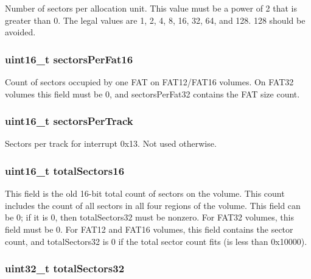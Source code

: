 Number of sectors per allocation unit. This value must be a power of 2 that is greater than 0. The legal values are 1, 2, 4, 8, 16, 32, 64, and 128. 128 should be avoided. \hypertarget{structfat__boot_abf85d1c57b01c8901a0cdcd0ac1babc2}{
\subsubsection[{sectors\-Per\-Fat16}]{\setlength{\rightskip}{0pt plus 5cm}uint16\-\_\-t sectors\-Per\-Fat16}}\label{structfat__boot_abf85d1c57b01c8901a0cdcd0ac1babc2}
Count of sectors occupied by one F\-A\-T on F\-A\-T12/\-F\-A\-T16 volumes. On F\-A\-T32 volumes this field must be 0, and sectors\-Per\-Fat32 contains the F\-A\-T size count. \hypertarget{structfat__boot_a42886f9109ee1759d5972e871f0689a8}{
\subsubsection[{sectors\-Per\-Track}]{\setlength{\rightskip}{0pt plus 5cm}uint16\-\_\-t sectors\-Per\-Track}}\label{structfat__boot_a42886f9109ee1759d5972e871f0689a8}
Sectors per track for interrupt 0x13. Not used otherwise. \hypertarget{structfat__boot_ad717f5b9af13f8ec9d0d6d1337174dfa}{
\subsubsection[{total\-Sectors16}]{\setlength{\rightskip}{0pt plus 5cm}uint16\-\_\-t total\-Sectors16}}\label{structfat__boot_ad717f5b9af13f8ec9d0d6d1337174dfa}
This field is the old 16-\/bit total count of sectors on the volume. This count includes the count of all sectors in all four regions of the volume. This field can be 0; if it is 0, then total\-Sectors32 must be nonzero. For F\-A\-T32 volumes, this field must be 0. For F\-A\-T12 and F\-A\-T16 volumes, this field contains the sector count, and total\-Sectors32 is 0 if the total sector count fits (is less than 0x10000). \hypertarget{structfat__boot_a64d5902f9e900ecc745b1c0b325d875f}{
\subsubsection[{total\-Sectors32}]{\setlength{\rightskip}{0pt plus 5cm}uint32\-\_\-t total\-Sectors32}}\label{structfat__boot_a64d5902f9e900ecc745b1c0b325d875f}
